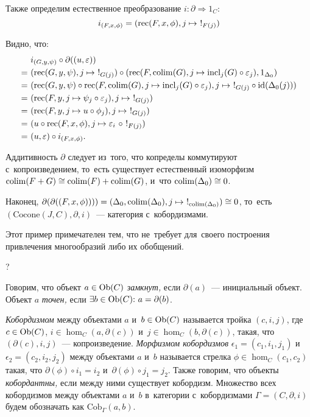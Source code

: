 \documentclass{article}
\begin{document}
Также определим естественное преобразование $i : \partial \Rightarrow 1_C$:
$$
    i_{(F, x, \phi)} = (\mathrm{rec}(F, x, \phi), j \mapsto\ !_{F(j)})
$$

Видно, что:
\begin{align*}
    \phantom{=}&\ i_{(G, y, \psi)} \circ \partial((u, \varepsilon)) \\
              =&\ (\rec(G, y, \psi), j \mapsto\ !_{G(j)}) \circ (\rec(F, \colim(G), j \mapsto \incl_j(G) \circ \varepsilon_j), 1_{\Delta_0}) \\
              =&\ (\rec(G, y, \psi) \circ \rec(F, \colim(G), j \mapsto \incl_j(G) \circ \varepsilon_j), j \mapsto\ !_{G(j)} \circ \id(\Delta_0(j))) \\
              =&\ (\rec(F, y, j \mapsto \psi_j \circ \varepsilon_j), j \mapsto\ !_{G(j)}) \\
              =&\ (\rec(F, y, j \mapsto u \circ \phi_j), j \mapsto\ !_{G(j)}) \\
              =&\ (u \circ \rec(F, x, \phi), j \mapsto \varepsilon_i\ \circ\ !_{F(j)}) \\
              =&\ (u, \varepsilon) \circ i_{(F, x, \phi)}.
\end{align*}

Аддитивность $\partial$ следует из~того, что копределы коммутируют с~копроизведением,
то~есть существует естественный изоморфизм $\mathrm{colim}(F + G) \cong \mathrm{colim}(F) + \mathrm{colim}(G)$,
и~что $\mathrm{colim}(\Delta_0) \cong 0$.

Наконец, $\partial(\partial((F, x, \phi)))) = (\Delta_0, \mathrm{colim}(\Delta_0), j \mapsto\ !_{\mathrm{colim}(\Delta_0)}) \cong 0$,
то~есть $(\mathrm{Cocone}(J, C), \partial, i)$~— категория с~кобордизмами.

Этот пример примечателен тем, что не~требует для~своего построения привлечения многообразий либо их обобщений.

?

Говорим, что объект $a \in \mathrm{Ob}(C)$ \textit{замкнут,} если $\partial(a)$~— инициальный объект.
Объект $a$ \textit{точен,} если $\exists b \in \Ob(C){:}\ a = \partial(b)$.

\textit{Кобордизмом} между объектами $a$ и~$b \in \mathrm{Ob}(C)$ называется тройка $(c, i, j)$,
где $c \in \mathrm{Ob}(C)$, $i \in \hom_C(a, \partial(c))$ и~$j \in \hom_C(b, \partial(c))$,
такая, что $(\partial(c), i, j)$~— копроизведение. \textit{Морфизмом кобордизмов} $\epsilon_1 = (c_1, i_1, j_1)$
и~$\epsilon_2 = (c_2, i_2, j_2)$ между объектами $a$ и~$b$ называется стрелка $\phi \in \hom_C(c_1, c_2)$
такая, что $\partial(\phi) \circ i_1 = i_2$ и~$\partial(\phi) \circ j_1 = j_2$. Также говорим, что объекты \textit{кобордантны,}
если между ними существует кобордизм. Множество всех кобордизмов между объектами $a$ и~$b$ в~категории с~кобордизмами
$\Gamma = (C, \partial, i)$ будем обозначать как $\mathrm{Cob}_\Gamma(a, b)$.
\end{document}
